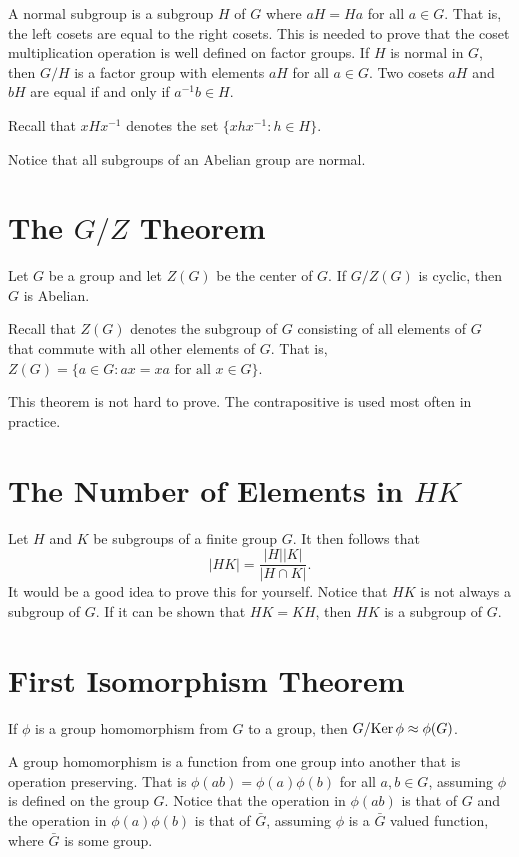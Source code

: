 \documentclass{article}
\begin{document}
A normal subgroup is a subgroup $H$ of $G$ where
$aH=Ha$ for all $a\in G$.  That is, the left cosets
are equal to the right cosets.  This is needed to
prove that the coset multiplication operation is well defined
on factor groups.  If $H$ is normal in $G$, then
$G/H$ is a factor group with elements $aH$ for all $a\in G$.
Two cosets $aH$ and $bH$ are equal if and only if $a^{-1}b\in H$.

Recall that $xHx^{-1}$ denotes the set $\{xhx^{-1}:h\in H\}$.

Notice that all subgroups of an Abelian group are normal.

\section*{The $G/Z$ Theorem}

Let $G$ be a group and let $Z(G)$ be the center of $G$.
If $G/Z(G)$ is cyclic, then $G$ is Abelian.

Recall that $Z(G)$ denotes the subgroup of $G$ consisting
of all elements of $G$ that commute with all other
elements of $G$.  That is, $Z(G)=\{a\in G:\mbox{$ax=xa$ for all $x\in G$}\}$.

This theorem is not hard to prove.  The contrapositive
is used most often in practice.

\section*{The Number of Elements in $HK$}

Let $H$ and $K$ be subgroups of a finite group $G$.
It then follows that
\begin{equation*}
|HK|=\frac{|H||K|}{|H\cap K|}.
\end{equation*}
It would be a good idea to prove this for yourself.
Notice that $HK$ is not always a subgroup of $G$.
If it can be shown that $HK=KH$, then $HK$ is
a subgroup of $G$.

\section*{First Isomorphism Theorem}

If $\phi$ is a group homomorphism from $G$ to a group, then
$G/\mbox{Ker}\,\phi\approx\phi(G)$.

A group homomorphism is a function from one group into another
that is operation preserving.  That is $\phi(ab)=\phi(a)\phi(b)$
for all $a,b\in G$, assuming $\phi$ is defined on the group $G$.
Notice that the operation in $\phi(ab)$ is that of $G$ and
the operation in $\phi(a)\phi(b)$ is that of $\bar{G}$, assuming
$\phi$ is a $\bar{G}$ valued function, where $\bar{G}$ is some group.
\end{document}
